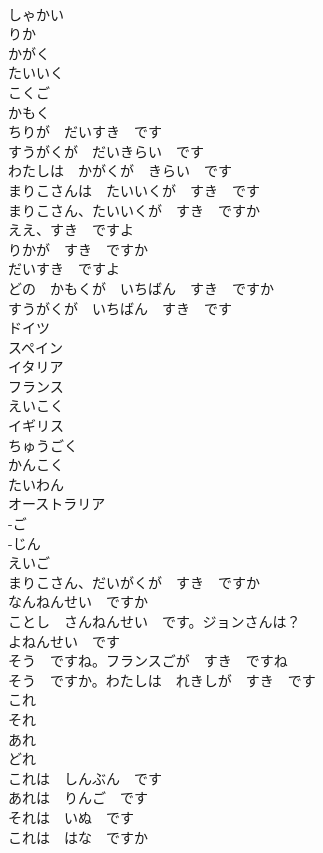 \documentclass[8pt]{extreport}
\begin{document}
\begin{CJK}{UTF8}{min}
\\	しゃかい	
\\	りか	
\\	かがく	
\\	たいいく	
\\	こくご	
\\	かもく	
\\	ちりが　だいすき　です	
\\	すうがくが　だいきらい　です	
\\	わたしは　かがくが　きらい　です	
\\	まりこさんは　たいいくが　すき　です	
\\	まりこさん、たいいくが　すき　ですか	
\\	ええ、すき　ですよ	
\\	りかが　すき　ですか	
\\	だいすき　ですよ	
\\	どの　かもくが　いちばん　すき　ですか	
\\	すうがくが　いちばん　すき　です	
\\	ドイツ	
\\	スペイン	
\\	イタリア	
\\	フランス	
\\	えいこく	
\\	イギリス	
\\	ちゅうごく	
\\	かんこく	
\\	たいわん	
\\	オーストラリア	
\\	-ご	
\\	-じん	
\\	えいご	
\\	まりこさん、だいがくが　すき　ですか	
\\	なんねんせい　ですか	
\\	ことし　さんねんせい　です。ジョンさんは？	
\\	よねんせい　です	
\\	そう　ですね。フランスごが　すき　ですね	
\\	そう　ですか。わたしは　れきしが　すき　です	
\\	これ	
\\	それ	
\\	あれ	
\\	どれ	
\\	これは　しんぶん　です	
\\	あれは　りんご　です	
\\	それは　いぬ　です	
\\	これは　はな　ですか	

\end{CJK}
\end{document}
